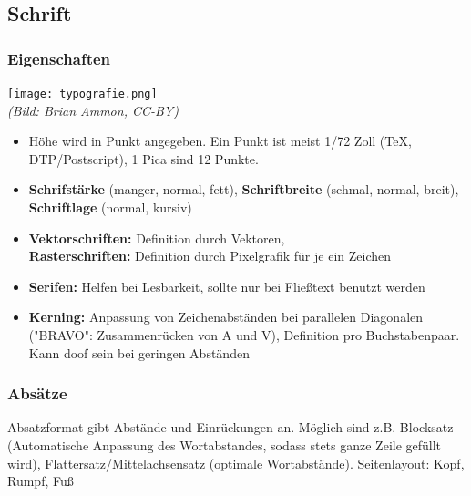 \documentclass[12pt,landscape]{article}
\begin{document}
\begin{multicols}{3}
\subsection{Schrift}
\subsubsection{Eigenschaften}
\begin{center}
\texttt{[image: typografie.png]}\\
\tiny{\textit{(Bild: Brian Ammon, CC-BY)}}
\end{center}
\begin{itemize}
\item Höhe wird in Punkt angegeben. Ein Punkt ist meist 1/72 Zoll (TeX, DTP/Postscript), 1 Pica sind 12 Punkte.
\item \textbf{Schrifstärke} (manger, normal, fett), \textbf{Schriftbreite} (schmal, normal, breit), \textbf{Schriftlage} (normal, kursiv)
\item \textbf{Vektorschriften:} Definition durch Vektoren,\\
\textbf{Rasterschriften:} Definition durch Pixelgrafik für je ein Zeichen
\item \textbf{Serifen:} Helfen bei Lesbarkeit, sollte nur bei Fließtext benutzt werden
\item \textbf{Kerning:} Anpassung von Zeichenabständen bei parallelen Diagonalen ("BRAVO": Zusammenrücken von A und V), Definition pro Buchstabenpaar. Kann doof sein bei geringen Abständen
\end{itemize}
\subsubsection{Absätze}
Absatzformat gibt Abstände und Einrückungen an. Möglich sind z.B. Blocksatz (Automatische Anpassung des Wortabstandes, sodass stets ganze Zeile gefüllt wird), Flattersatz/Mittelachsensatz (optimale Wortabstände). Seitenlayout: Kopf, Rumpf, Fuß

\end{multicols}
\end{document}
